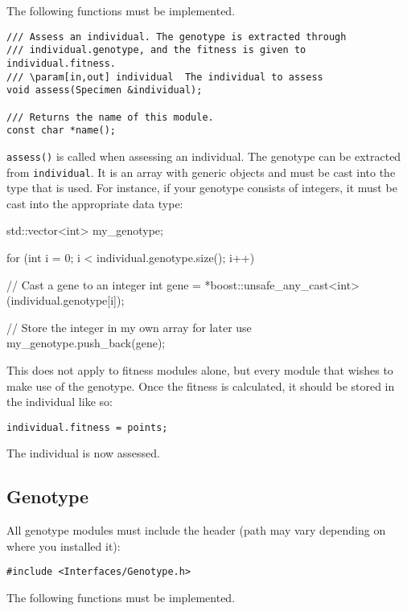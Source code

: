 \noindent The following functions must be implemented.

\begin{verbatim}
/// Assess an individual. The genotype is extracted through
/// individual.genotype, and the fitness is given to individual.fitness.
/// \param[in,out] individual  The individual to assess
void assess(Specimen &individual);

/// Returns the name of this module.
const char *name();
\end{verbatim}

\noindent \texttt{assess()} is called when assessing an individual. The genotype can be extracted from \texttt{individual}. It is an array with generic objects and must be cast into the type that is used. For instance, if your genotype consists of integers, it must be cast into the appropriate data type:

\begin{verbatimtab}
std::vector<int> my_genotype;

for (int i = 0; i < individual.genotype.size(); i++)
{
	// Cast a gene to an integer
	int gene = *boost::unsafe_any_cast<int>(individual.genotype[i]);

	// Store the integer in my own array for later use
	my_genotype.push_back(gene);
}
\end{verbatimtab}

\noindent This does not apply to fitness modules alone, but every module that wishes to make use of the genotype. Once the fitness is calculated, it should be stored in the individual like so:

\begin{verbatim}
individual.fitness = points;
\end{verbatim}

\noindent The individual is now assessed.


\subsection{Genotype}

All genotype modules must include the header (path may vary depending on where you installed it):

\begin{verbatim}
#include <Interfaces/Genotype.h>
\end{verbatim}

\noindent The following functions must be implemented.

